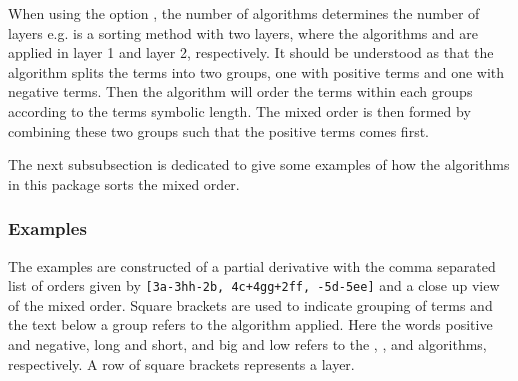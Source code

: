 \documentclass[final,british,10pt]{scrartcl}
\theoremstyle{remark}
\begin{document}
When using the option , the number of algorithms determines the number of layers e.g.  is a sorting method with two layers, where the algorithms  and  are applied in layer \num{1} and layer \num{2}, respectively. It should be understood as that the  algorithm splits the terms into two groups, one with positive terms and one with negative terms. Then the  algorithm will order the terms within each groups according to the terms symbolic length. The mixed order is then formed by combining these two groups such that the positive terms comes first.

The next subsubsection is dedicated to give some examples of how the algorithms in this package sorts the mixed order.

\subsubsection{Examples}
The examples are constructed of a partial derivative with the comma separated list of orders given by \texttt{[3a-3hh-2b, 4c+4gg+2ff, -5d-5ee]} and a close up view of the mixed order. Square brackets are used to indicate grouping of terms and the text below a group refers to the algorithm applied. Here the words positive and negative, long and short, and big and low refers to the , , and  algorithms, respectively. A row of square brackets represents a layer.
\end{document}
